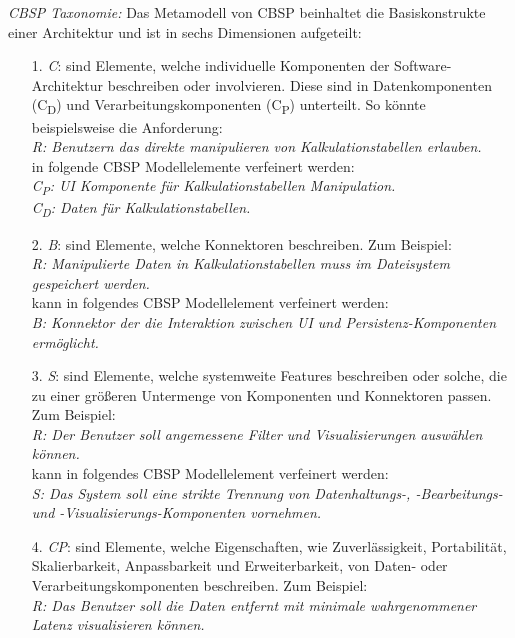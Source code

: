 \emph{CBSP Taxonomie:}
Das Metamodell von CBSP beinhaltet die Basiskonstrukte einer Architektur und ist in sechs Dimensionen aufgeteilt: \\

\begin{itemize}
\item[1.] \textit{C}: sind Elemente, welche individuelle Komponenten der Software-Architektur beschreiben oder involvieren. Diese sind in Datenkomponenten (C\textsubscript{D}) und Verarbeitungskomponenten (C\textsubscript{P}) unterteilt. So k\"onnte beispielsweise die Anforderung: \\
	\textit{R: Benutzern das direkte manipulieren von Kalkulationstabellen erlauben.} \\
	in folgende CBSP Modellelemente verfeinert werden: \\
	\textit{C\textsubscript{P}: UI Komponente f\"ur Kalkulationstabellen Manipulation.} \\
	\textit{C\textsubscript{D}: Daten f\"ur Kalkulationstabellen.}  \cite{Gru01}
\item[2.] \textit{B}: sind Elemente, welche Konnektoren beschreiben. Zum Beispiel: \\
	\textit{R: Manipulierte Daten in Kalkulationstabellen muss im Dateisystem gespeichert werden.} \\
	kann in folgendes CBSP Modellelement verfeinert werden: \\
	\textit{B: Konnektor der die Interaktion zwischen UI und Persistenz-Komponenten erm\"oglicht.} \cite{Gru01}
\item[3.] \textit{S}: sind Elemente, welche systemweite Features beschreiben oder solche, die zu einer gr\"o\ss{}eren Untermenge von Komponenten und Konnektoren passen. Zum Beispiel: \\
	\textit{R: Der Benutzer soll angemessene Filter und Visualisierungen ausw\"ahlen k\"onnen.} \\
	kann in folgendes CBSP Modellelement verfeinert werden: \\
	\textit{S: Das System soll eine strikte Trennung von Datenhaltungs-, -Bearbeitungs- und -Visualisierungs-Komponenten vornehmen.} \cite{Gru01}
\item[4.] \textit{CP}: sind Elemente, welche Eigenschaften, wie Zuverl\"assigkeit, Portabilit\"at, Skalierbarkeit, Anpassbarkeit und Erweiterbarkeit, von Daten- oder Verarbeitungskomponenten beschreiben. Zum Beispiel: \\
	\textit{R: Das Benutzer soll die Daten entfernt mit minimale wahrgenommener Latenz visualisieren k\"onnen.} \\

\end{itemize}
